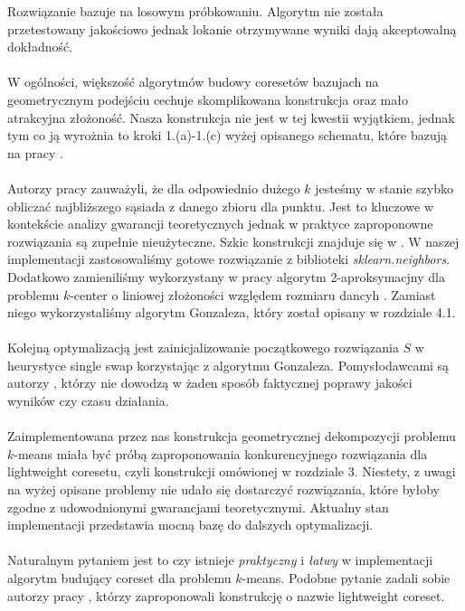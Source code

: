 Rozwiązanie bazuje na losowym próbkowaniu.
Algorytm nie została przetestowany jakościowo jednak lokanie otrzymywane wyniki dają akceptowalną dokładność. 
\\~\\
W ogólności, większość algorytmów budowy coresetów bazujach na geometrycznym podejściu cechuje skomplikowana konstrukcja oraz mało atrakcyjna złożoność.
Nasza konstrukcja nie jest w tej kwestii wyjątkiem, jednak tym co ją wyrożnia to kroki 1.(a)-1.(c) wyżej opisanego schematu, które bazują na pracy \cite{10.1145/1007352.1007400}.
\\~\\
Autorzy pracy \cite{10.1145/1007352.1007400} zauważyli, że dla odpowiednio dużego $k$ jesteśmy w stanie szybko obliczać najbliższego sąsiada z danego zbioru dla punktu.
Jest to kluczowe w kontekście analizy gwarancji teoretycznych jednak w praktyce zaproponowne rozwiązania są zupełnie nieużyteczne.
Szkic konstrukcji znajduje się w \cite{10.1145/1007352.1007400}.
W naszej implementacji zastosowaliśmy gotowe rozwiązanie z biblioteki \textit{sklearn.neighbors}.
Dodatkowo zamieniliśmy wykorzystany w pracy \cite{10.1145/1007352.1007400} algorytm 2-aproksymacjny dla problemu $k$-center o liniowej złożoności względem rozmiaru dancyh \cite{10.5555/3116656.3116964}.
Zamiast niego wykorzystaliśmy algorytm Gonzaleza, który został opisany w rozdziale 4.1.
\\~\\
Kolejną optymalizacją jest zainicjalizowanie początkowego rozwiązania $S$ w heurystyce single swap korzystając z algorytmu Gonzaleza.
Pomysłodawcami są autorzy \cite{10.1145/1007352.1007400}, którzy nie dowodzą w żaden sposób faktycznej poprawy jakości wyników czy czasu działania.
\\~\\
Zaimplementowana przez nas konstrukcja geometrycznej dekompozycji problemu $k$-means miała być próbą zaproponowania konkurencyjnego rozwiązania dla lightweight coresetu, czyli konstrukcji omówionej w rozdziale 3.
Niestety, z uwagi na wyżej opisane problemy nie udało się dostarczyć rozwiązania, które byłoby zgodne z udowodnionymi gwarancjami teoretycznymi.
Aktualny stan implementacji przedstawia mocną bazę do dalszych optymalizacji.   
\\~\\
Naturalnym pytaniem jest to czy istnieje \textit{praktyczny} i \textit{łatwy} w implementacji algorytm budujący coreset dla problemu $k$-means.
Podobne pytanie zadali sobie autorzy pracy \cite{bachem2017scalable}, którzy zaproponowali konstrukcję o nazwie lightweight coreset.

